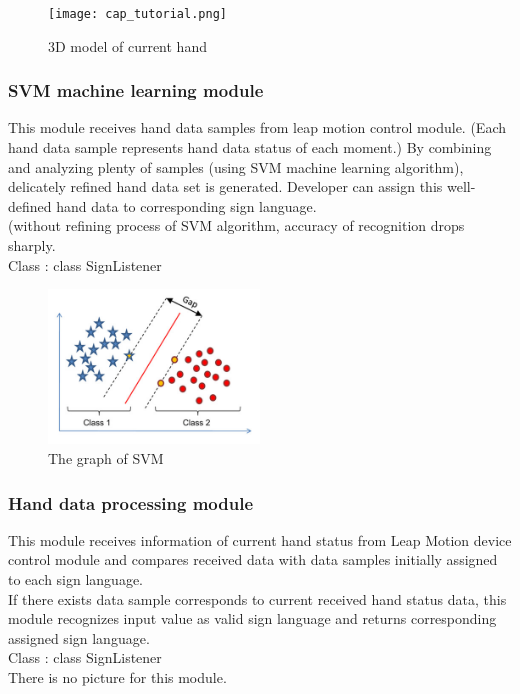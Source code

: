 \documentclass[10pt,journal,compsoc]{IEEEtran}
\begin{document}
\begin{figure}[H]
\centering
\texttt{[image: cap\_tutorial.png]}
{\caption*{3D model of current hand}}
\end{figure}
\subsubsection{SVM machine learning module\\}

This module receives hand data samples from leap motion control module. (Each hand data sample represents hand data status of each moment.) By combining and analyzing plenty of samples (using SVM machine learning algorithm), delicately refined hand data set is generated. Developer can assign this well-defined hand data to corresponding sign language.
\\(without refining process of SVM algorithm, accuracy of recognition drops sharply.
\\Class : class SignListener

\begin{figure}[H]
\centering
\includegraphics[width=0.5\textwidth]{SVM.jpg}
{\caption*{The graph of SVM}}
\end{figure}
\subsubsection{Hand data processing module\\}

This module receives information of current hand status from Leap Motion device control module and compares received data with data samples initially assigned to each sign language.
\\If there exists data sample corresponds to current received hand status data, this module recognizes input value as valid sign language and returns corresponding assigned sign language.
\\Class : class SignListener
\\There is no picture for this module.
\end{document}
